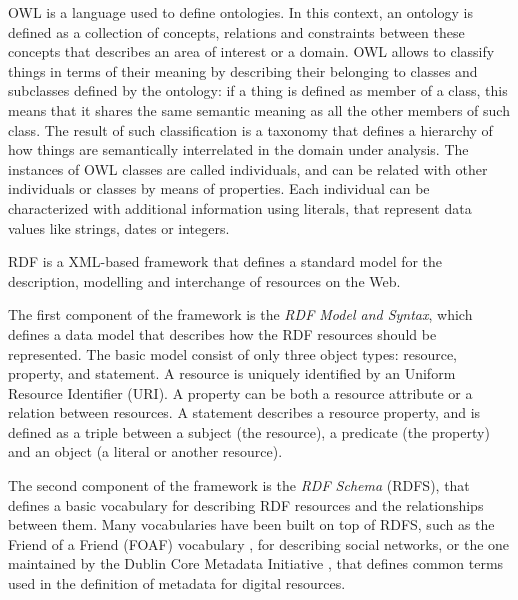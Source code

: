 \documentclass[%
    corpo=13.5pt,
    twoside,
    oldstyle,
    tipotesi=magistrale,
    greek,
    evenboxes
]{toptesi}
\begin{document}
OWL is a language used to define ontologies. In this context, an ontology
is defined as a collection of concepts, relations and constraints between
these concepts that describes an area of interest or a domain.
OWL allows to classify things in terms of their meaning by describing
their belonging to classes and subclasses defined by the ontology: if
a thing is defined as member of a class, this means that it shares the
same semantic meaning as all the other members of such class. The result of
such classification is a taxonomy that defines a hierarchy of how things
are semantically interrelated in the domain under analysis.
The instances of OWL classes are called individuals, and can be related
with other individuals or classes by means of properties. Each individual
can be characterized with additional information using literals, that
represent data values like strings, dates or integers.
\newline

RDF is a XML-based framework that defines a standard model for the
description, modelling and interchange of resources on the Web.

The first component of the framework is the \emph{RDF Model and Syntax},
which defines a data model that describes how the RDF resources should be
represented. The basic model consist of only three object types: resource,
property, and statement.
A resource is uniquely identified by an Uniform Resource Identifier (URI).
A property can be both a resource attribute or a relation between resources.
A statement describes a resource property, and is defined as a triple
between a subject (the resource), a predicate (the property) and an
object (a literal or another resource).

The second component of the framework is the \emph{RDF Schema} (RDFS),
that defines a basic vocabulary for describing RDF resources and the
relationships between them. Many vocabularies have been built on top of
RDFS, such as the Friend of a Friend (FOAF) vocabulary \cite{brickley2007}, for
describing social networks, or the one maintained by the Dublin Core Metadata
Initiative \cite{weibel1998}, that defines common
terms used in the definition of metadata for digital resources.
\end{document}
